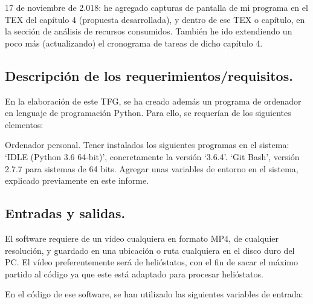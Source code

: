 17 de noviembre de 2.018: he agregado capturas de pantalla de mi programa en el TEX del capítulo 4 (propuesta desarrollada), y dentro de ese TEX o capítulo, en la sección de análisis de recursos consumidos. También he ido extendiendo un poco más (actualizando) el cronograma de tareas de dicho capítulo 4.

\subsection{Descripción de los requerimientos/requisitos.}

En la elaboración de este TFG, se ha creado además un programa de ordenador en lenguaje de programación Python. Para ello, se requerían de los siguientes elementos:

Ordenador personal.
Tener instalados los siguientes programas en el sistema:
‘IDLE (Python 3.6 64-bit)’, concretamente la versión ‘3.6.4’.
‘Git Bash’, versión 2.7.7 para sistemas de 64 bits.
Agregar unas variables de entorno en el sistema, explicado previamente en este informe.

\subsection{Entradas y salidas.}

El software requiere de un vídeo cualquiera en formato MP4, de cualquier resolución, y guardado en una ubicación o ruta cualquiera en el disco duro del PC. El vídeo preferentemente será de helióstatos, con el fin de sacar el máximo partido al código ya que este está adaptado para procesar helióstatos.

En el código de ese software, se han utilizado las siguientes variables de entrada:

